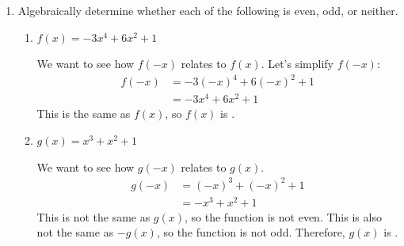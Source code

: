 \documentclass{article}
\begin{document}
\begin{enumerate}[resume]
\begin{solution}
    
    The function is defined in two pieces. On the interval $(-\infty,3)$, the graph of the function
    looks like the graph of $y=1$. On the interval $[3,\infty)$, the graph of the function looks like
    the graph of $y=x$. To show that $f(3)$ is $3$ and not $1$, we draw a filled circle at
    $(3,3)$ and an empty circle at $(1,3)$. 

    
  \end{solution}



\item  \label{even-odd-1}

  Algebraically determine whether each of the following is even, odd, or neither.
  \begin{enumerate}
  \item
    \begin{problem}[\vfill]
      $f(x) = -3x^4 + 6x^2 + 1$
    \end{problem}

    \begin{solution}
      We want to see how $f(-x)$ relates to $f(x)$.  Let's simplify
      $f(-x)$:
      \begin{align*}
        f(-x) &= -3 (-x)^4 + 6 (-x)^2 + 1\\
        &= -3 x^4 + 6x^2 + 1 
      \end{align*}
      This is the same as $f(x)$, so $f(x)$ is .
    \end{solution}

  \item
    \begin{problem}[\stretch{2}]
      $\displaystyle g(x) = x^3 + {x^2} + 1$
    \end{problem}

    \begin{solution}
      We want to see how $g(-x)$ relates to $g(x)$.
      \begin{align*}
        g(-x) &= (-x)^3 + {(-x)^2} + 1 \\
        &= -x^3 + x^2 + 1
      \end{align*}
      This is not the same as $g(x)$, so the function is not even.
      This is also not the same as $-g(x)$, so the function is not
      odd. Therefore, $g(x)$ is .
    \end{solution}
  \end{enumerate}

\end{enumerate}
\end{document}
